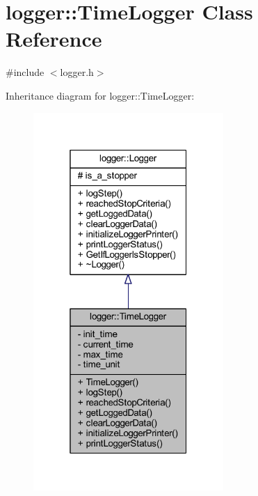 \hypertarget{classlogger_1_1_time_logger}{}\section{logger\+:\+:Time\+Logger Class Reference}
\label{classlogger_1_1_time_logger}


{\ttfamily \#include $<$logger.\+h$>$}



Inheritance diagram for logger\+:\+:Time\+Logger\+:
\nopagebreak
\begin{figure}[H]
\begin{center}
\leavevmode
\includegraphics[width=205pt]{classlogger_1_1_time_logger__inherit__graph}
\end{center}
\end{figure}


